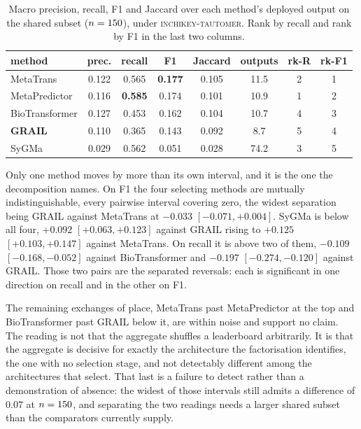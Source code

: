 \begin{table}[h]
\caption{Macro precision, recall, F1 and Jaccard over each method's deployed output on the shared
subset ($n=150$), under \textsc{inchikey-tautomer}. Rank by recall and rank by F1 in the last
two columns.}
\label{tab:setmetrics}
\begin{center}
\begin{tabular}{lccccc cc}
\toprule
\textbf{method} & prec. & recall & F1 & Jaccard & outputs & rk-R & rk-F1 \\
\midrule
MetaTrans        & 0.122 & 0.565 & \textbf{0.177} & 0.105 & 11.5 & 2 & 1 \\
MetaPredictor    & 0.116 & \textbf{0.585} & 0.174 & 0.101 & 10.9 & 1 & 2 \\
BioTransformer   & 0.127 & 0.453 & 0.162 & 0.104 & 10.7 & 4 & 3 \\
\textbf{GRAIL}   & 0.110 & 0.365 & 0.143 & 0.092 & \phantom{0}8.7 & 5 & 4 \\
SyGMa            & 0.029 & 0.562 & 0.051 & 0.028 & 74.2 & 3 & 5 \\
\bottomrule
\end{tabular}
\end{center}
\end{table}

Only one method moves by more than its own interval, and it is the one the decomposition names. On F1 the four
selecting methods are mutually indistinguishable, every pairwise interval covering zero, the widest
separation being GRAIL against MetaTrans at $-0.033$ $[-0.071,+0.004]$. SyGMa is below all four,
$+0.092$ $[+0.063,+0.123]$ against GRAIL rising to $+0.125$ $[+0.103,+0.147]$ against MetaTrans.
On recall it is above two of them, $-0.109$ $[-0.168,-0.052]$ against BioTransformer and $-0.197$
$[-0.274,-0.120]$ against GRAIL. Those two pairs are the separated reversals: each is significant
in one direction on recall and in the other on F1.

The remaining exchanges of place, MetaTrans past MetaPredictor at the top and BioTransformer past
GRAIL below it, are within noise and support no claim. The reading is not that the aggregate
shuffles a leaderboard arbitrarily. It is that the aggregate is decisive for exactly the
architecture the factorisation identifies, the one with no selection stage, and not detectably
different among the architectures that select. That last is a failure to detect rather than a
demonstration of absence: the widest of those intervals still admits a difference of $0.07$ at
$n=150$, and separating the two readings needs a larger shared subset than the comparators
currently supply.

